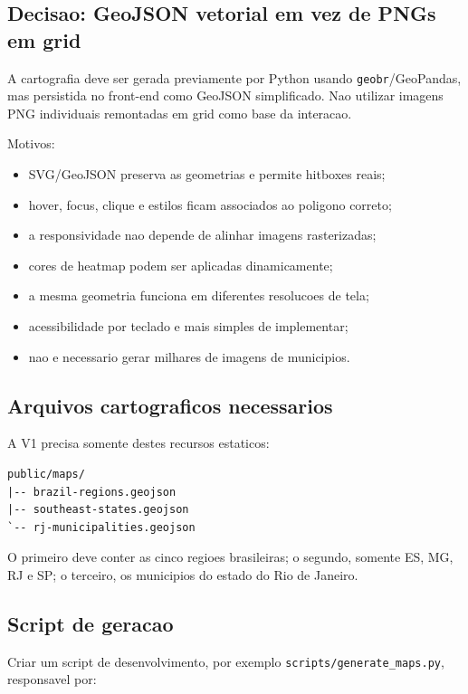 \documentclass[12pt,a4paper]{article}
\begin{document}
\subsection{Decisao: GeoJSON vetorial em vez de PNGs em grid}

A cartografia deve ser gerada previamente por Python usando \texttt{geobr}/GeoPandas, mas persistida no front-end como GeoJSON simplificado. Nao utilizar imagens PNG individuais remontadas em grid como base da interacao.

Motivos:

\begin{itemize}[leftmargin=*]
    \item SVG/GeoJSON preserva as geometrias e permite hitboxes reais;
    \item hover, focus, clique e estilos ficam associados ao poligono correto;
    \item a responsividade nao depende de alinhar imagens rasterizadas;
    \item cores de heatmap podem ser aplicadas dinamicamente;
    \item a mesma geometria funciona em diferentes resolucoes de tela;
    \item acessibilidade por teclado e mais simples de implementar;
    \item nao e necessario gerar milhares de imagens de municipios.
\end{itemize}

\subsection{Arquivos cartograficos necessarios}

A V1 precisa somente destes recursos estaticos:

\begin{lstlisting}
public/maps/
|-- brazil-regions.geojson
|-- southeast-states.geojson
`-- rj-municipalities.geojson
\end{lstlisting}

O primeiro deve conter as cinco regioes brasileiras; o segundo, somente ES, MG, RJ e SP; o terceiro, os municipios do estado do Rio de Janeiro.

\subsection{Script de geracao}

Criar um script de desenvolvimento, por exemplo \texttt{scripts/generate\_maps.py}, responsavel por:
\end{document}
